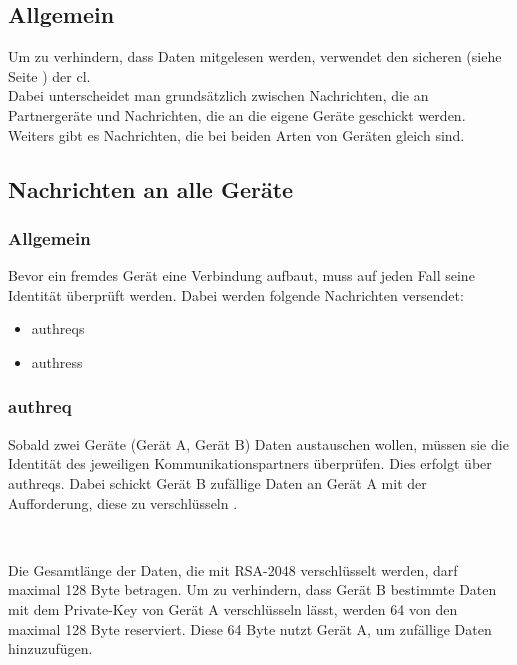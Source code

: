 \subsection{Allgemein}
Um zu verhindern, dass Daten mitgelesen werden, verwendet \sblit den sicheren  (siehe Seite \pageref{Applicationchannel}) der \gls{cl}.\\
Dabei unterscheidet man grundsätzlich zwischen Nachrichten, die an Partnergeräte  und Nachrichten, die an die eigene Geräte geschickt werden. Weiters gibt es Nachrichten, die bei beiden Arten von Geräten gleich sind.

\subsection{Nachrichten an alle Geräte}
\subsubsection{Allgemein}
Bevor ein fremdes Gerät eine Verbindung aufbaut, muss auf jeden Fall seine Identität überprüft werden. Dabei werden folgende Nachrichten versendet:
\begin{itemize}
	\item \gls{authreq}s
	\item \gls{authres}s
\end{itemize}

\subsubsection{\gls{authreq}}
Sobald zwei Geräte (Gerät A, Gerät B) Daten austauschen wollen, müssen sie die Identität des jeweiligen Kommunikationspartners überprüfen. Dies erfolgt über \gls{authreq}s. Dabei schickt Gerät B zufällige Daten an Gerät A mit der Aufforderung, diese zu verschlüsseln . 
\messagestart
	 \\
	
	\begin{rightwordgroup}{\isprotomsgtype}
	\end{rightwordgroup} \\
	
	\begin{rightwordgroup}{\isprotomsgdata}
	\end{rightwordgroup}
	
Die Gesamtlänge der Daten, die mit RSA-2048 verschlüsselt werden, darf maximal 128 Byte betragen. Um zu verhindern, dass Gerät B bestimmte Daten mit dem Private-Key von Gerät A verschlüsseln lässt, werden 64 von den maximal 128 Byte reserviert. Diese 64 Byte nutzt Gerät A, um zufällige Daten hinzuzufügen.

